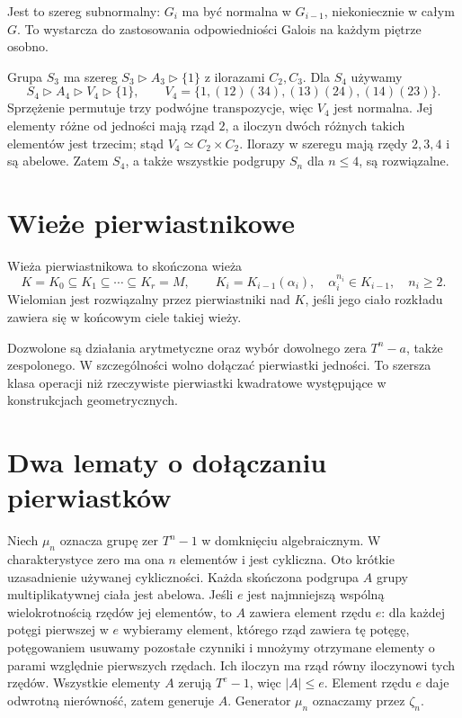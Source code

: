 \begin{uwaga}
Jest to szereg subnormalny: $G_i$ ma być normalna w $G_{i-1}$, niekoniecznie w całym $G$. To wystarcza do zastosowania odpowiedniości Galois na każdym piętrze osobno.
\end{uwaga}

\begin{przyklad}
Grupa $S_3$ ma szereg $S_3\triangleright A_3\triangleright\{1\}$ z ilorazami $C_2,C_3$. Dla $S_4$ używamy
\[
S_4\triangleright A_4\triangleright V_4\triangleright\{1\},\qquad
V_4=\{1,(12)(34),(13)(24),(14)(23)\}.
\]
Sprzężenie permutuje trzy podwójne transpozycje, więc $V_4$ jest normalna. Jej elementy różne od jedności mają rząd $2$, a iloczyn dwóch różnych takich elementów jest trzecim; stąd $V_4\simeq C_2\times C_2$. Ilorazy w szeregu mają rzędy $2,3,4$ i są abelowe. Zatem $S_4$, a także wszystkie podgrupy $S_n$ dla $n\le4$, są rozwiązalne.
\end{przyklad}

\section{Wieże pierwiastnikowe}

\begin{definicja}
Wieża pierwiastnikowa to skończona wieża
\[
K=K_0\subseteq K_1\subseteq\cdots\subseteq K_r=M,\qquad
K_i=K_{i-1}(\alpha_i),\quad \alpha_i^{n_i}\in K_{i-1},\quad n_i\ge2.
\]
Wielomian jest rozwiązalny przez pierwiastniki nad $K$, jeśli jego ciało rozkładu zawiera się w końcowym ciele takiej wieży.
\end{definicja}

Dozwolone są działania arytmetyczne oraz wybór dowolnego zera $T^n-a$, także zespolonego. W szczególności wolno dołączać pierwiastki jedności. To szersza klasa operacji niż rzeczywiste pierwiastki kwadratowe występujące w konstrukcjach geometrycznych.

\section{Dwa lematy o dołączaniu pierwiastków}

Niech $\mu_n$ oznacza grupę zer $T^n-1$ w domknięciu algebraicznym. W charakterystyce zero ma ona $n$ elementów i jest cykliczna. Oto krótkie uzasadnienie używanej cykliczności. Każda skończona podgrupa $A$ grupy multiplikatywnej ciała jest abelowa. Jeśli $e$ jest najmniejszą wspólną wielokrotnością rzędów jej elementów, to $A$ zawiera element rzędu $e$: dla każdej potęgi pierwszej w $e$ wybieramy element, którego rząd zawiera tę potęgę, potęgowaniem usuwamy pozostałe czynniki i mnożymy otrzymane elementy o parami względnie pierwszych rzędach. Ich iloczyn ma rząd równy iloczynowi tych rzędów. Wszystkie elementy $A$ zerują $T^e-1$, więc $|A|\le e$. Element rzędu $e$ daje odwrotną nierówność, zatem generuje $A$. Generator $\mu_n$ oznaczamy przez $\zeta_n$.

